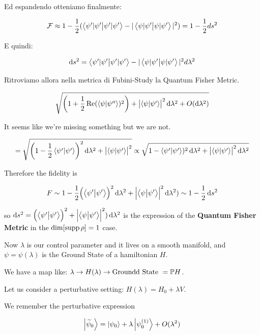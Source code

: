 \documentclass[main.tex]{subfiles}
\begin{document}
Ed espandendo otteniamo finalmente:

\begin{align*}
\mathcal{F} \approx 1-\frac{1}{2}(\braket{\psi'|\psi'} - |\braket{\psi|\psi'}|^2) = 1-\frac{1}{2}ds^2
\end{align*}

E quindi:

\begin{align*}
\dd{s^2} = \braket{\psi'|\psi'}-|\braket{\psi|\psi'}|^2 d\lambda^2
\end{align*}

Ritroviamo allora nella metrica di Fubini-Study la Quantum Fisher Metric.

\begin{equation}
  \sqrt{\qty(1+ \frac{1}{2} \Re(\braket{\psi}{\psi''} )^2) + \abs{\braket{\psi}{\psi'} }^2 \dd{\lambda^2} + O(\dd{\lambda^2}) }
\end{equation}

It seems like we're missing something but we are not.

\begin{equation}
  = \sqrt{\qty(1 - \frac{1}{2} \braket{\psi'}{\psi'} )^2 \dd{\lambda^2} + \abs{\braket{\psi}{\psi'} }^2 }
  \propto \sqrt{1 - \braket{\psi'}{\psi'} )^2 \dd{\lambda^2}  + \abs{\braket{\psi}{\psi'} }^2 \dd{\lambda^2}}
\end{equation}

Therefore the fidelity is

\begin{equation}
  F \sim 1 - \frac{1}{2} \qty(\braket{\psi'}{\psi'} )^2 \dd{\lambda^2}  + \abs{\braket{\psi}{\psi'} }^2 \dd{\lambda^2})
  \sim 1 - \frac{1}{2}\dd{s^2}
\end{equation}

so \(\dd{s^2} = \qty(\braket{\psi'}{\psi'} )^2  + \abs{\braket{\psi}{\psi'} }^2) \dd{\lambda^2}\)
is the expression of the \textbf{Quantum Fisher Metric} in the \(\dim \qty[ \supp{\rho}] = 1\) case.

Now \(\lambda\) is our control parameter and it lives on a smooth manifold, and \(\psi = \psi(\lambda)\) is the Ground State of a hamiltonian \(H\).

We have a map like: \(\lambda \rightarrow H(\lambda) \rightarrow \text{Groundd State }  = \P H\).

Let us consider a perturbative setting: \(H(\lambda) = H_0 + \lambda V\).

We remember the perturbative expression

\begin{equation}
  \ket{\widetilde{\psi}_0 } = \ket{\psi_0} + \lambda \ket{\psi_0^{(1)}} + O(\lambda^2)
\end{equation}
\end{document}

